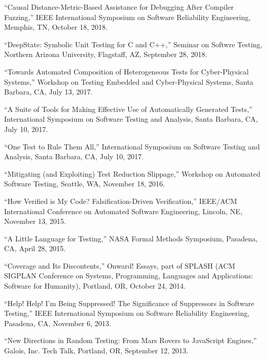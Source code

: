 \documentclass[ComputerScience]{vita}
\begin{document}
\begin{vita}
\begin{Selected Presentations}
\item ``Causal Distance-Metric-Based Assistance for Debugging After
  Compiler Fuzzing,'' IEEE International Symposium on Software
  Reliability Engineering, Memphis, TN, October 18, 2018.
  
\item ``DeepState: Symbolic Unit Testing for C and C++,'' Seminar on
  Softwre Testing, Northern Arizona University, Flagstaff, AZ,
  September 28, 2018.
  
\item ``Towards Automated Composition of Heterogeneous Tests for Cyber-Physical Systems,'' Workshop on Testing Embedded and Cyber-Physical Systems, Santa Barbara, CA, July 13, 2017.

\item ``A Suite of Tools for Making Effective Use of Automatically Generated Tests,'' International Symposium on Software Testing and Analysis, Santa Barbara, CA, July 10, 2017.

\item ``One Test to Rule Them All,'' International Symposium on Software Testing and Analysis, Santa Barbara, CA, July 10, 2017.

\item ``Mitigating (and Exploiting) Test Reduction Slippage,'' Workshop on Automated Software Testing, Seattle, WA, November 18, 2016.

\item ``How Verified is My Code?  Falsification-Driven Verification,'' IEEE/ACM International Conference on Automated Software Engineering, Lincoln, NE, November 13, 2015.

\item ``A Little Language for Testing,'' NASA Formal Methods Symposium, Pasadena, CA, April 28, 2015.

\item ``Coverage and Its Discontents,'' Onward! Essays, part of SPLASH (ACM SIGPLAN Conference on Systems, Programming, Languages and Applications: Software for Humanity), Portland, OR, October 24, 2014.

\item ``Help! Help! I'm Being Suppressed! The Significance of Suppressors in Software Testing,'' IEEE International Symposium on Software Reliability Engineering, Pasadena, CA, November 6, 2013.

\item ``New Directions in Random Testing: From Mars Rovers to JavaScript Engines,'' Galois, Inc. Tech Talk, Portland, OR, September 12, 2013.


\end{Selected Presentations}
\end{vita}
\end{document}
